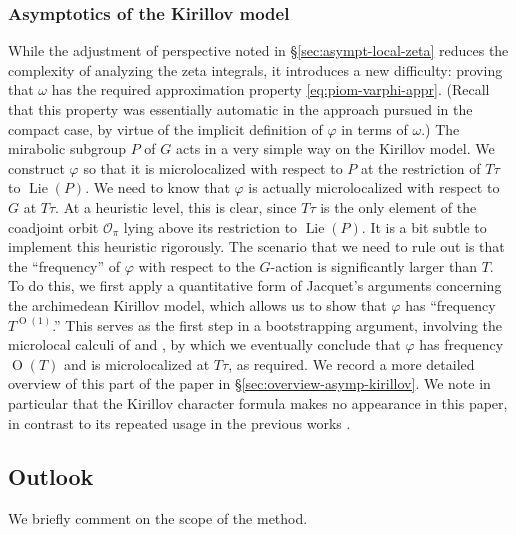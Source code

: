 \documentclass[reqno]{amsart}
\DeclareMathOperator{\Lie}{Lie}
\def\O{\operatorname{O}}
\theoremstyle{plain} \newtheorem{theorem} {Theorem}
\theoremstyle{definition} \newtheorem{definition} [theorem] {Definition}
\theoremstyle{itplain} %
\numberwithin{equation}{section}
\numberwithin{theorem}{section}
\begin{document}
\subsubsection{Asymptotics of the Kirillov model}\label{sec:asympt-kirill-model}
While the adjustment of perspective noted in \S\ref{sec:asympt-local-zeta} reduces the complexity of analyzing the zeta integrals, it introduces a new difficulty: proving that $\omega$ has the required approximation property \eqref{eq:piom-varphi-appr}.  (Recall that this property was essentially automatic in the approach pursued in the compact case, by virtue of the implicit definition of $\varphi$ in terms of $\omega$.)  The mirabolic subgroup $P$ of $G$ acts in a very simple way on the Kirillov model.  We construct $\varphi$ so that it is microlocalized with respect to $P$ at the restriction of $T \tau$ to $\Lie(P)$.  We need to know that $\varphi$ is actually microlocalized with respect to $G$ at $T \tau$.  At a heuristic level, this is clear, since $T \tau$ is the only element of the coadjoint orbit $\mathcal{O}_\pi$ lying above its restriction to $\Lie(P)$.  It is a bit subtle to implement this heuristic rigorously.  The scenario that we need to rule out is that the ``frequency'' of $\varphi$ with respect to the $G$-action is significantly larger than $T$.  To do this, we first apply a quantitative form of Jacquet's arguments \cite[\S3]{MR2733072} concerning the archimedean Kirillov model, which allows us to show that $\varphi$ has ``frequency $T^{\O(1)}$.''  This serves as the first step in a bootstrapping argument, involving the microlocal calculi of \cite{nelson-venkatesh-1} and \cite{2020arXiv201202187N}, by which we eventually conclude that $\varphi$ has frequency $\O(T)$ and is microlocalized at $T \tau$, as required.  We record a more detailed overview of this part of the paper in \S\ref{sec:overview-asymp-kirillov}.  We note in particular that the Kirillov character formula makes no appearance in this paper, in contrast to its repeated usage in the previous works \cite{nelson-venkatesh-1, 2020arXiv201202187N}.

\subsection{Outlook}
We briefly comment on the scope of the method.
\end{document}
